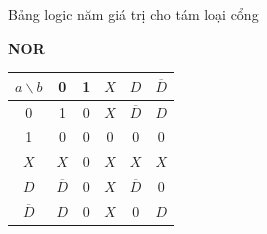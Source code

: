 \begin{frame}{Bảng logic năm giá trị cho tám loại cổng}
\begin{minipage}[t]{0.24\textwidth}
\end{minipage}\hfill
\begin{minipage}[t]{0.24\textwidth}\centering
\textbf{NOR}\\[1pt]
\begin{tabular}{@{}c|ccccc@{}}
$a\backslash b$ & 0 & 1 & $X$ & $D$ & $\overline{D}$\\\hline
0 & 1 & 0 & $X$ & $\overline{D}$ & $D$\\
1 & 0 & 0 & 0 & 0 & 0\\
$X$ & $X$ & 0 & $X$ & $X$ & $X$\\
$D$ & $\overline{D}$ & 0 & $X$ & $\overline{D}$ & 0\\
$\overline{D}$ & $D$ & 0 & $X$ & 0 & $D$\\
\end{tabular}
\end{minipage}


\end{frame}
